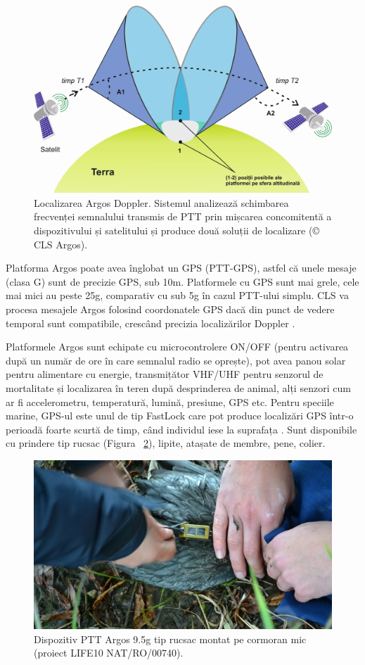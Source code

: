 \documentclass[11pt,onehalfspacing]{elife}
\begin{document}
\begin{figure}[ht]
\includegraphics[width=\textwidth]{Fig3.jpg}
\caption{Localizarea Argos Doppler. Sistemul analizează schimbarea frecvenței semnalului transmis de PTT prin mișcarea concomitentă a dispozitivului și satelitului și produce două soluții de localizare (© CLS Argos).} \label{fig3}
\end{figure}

Platforma Argos poate avea înglobat un GPS (PTT-GPS), astfel că unele mesaje (clasa G) sunt de precizie GPS, sub 10m. Platformele cu GPS sunt mai grele, cele mai mici au peste 25g, comparativ cu sub 5g în cazul PTT-ului simplu. CLS va procesa mesajele Argos folosind coordonatele GPS dacă din punct de vedere temporal sunt compatibile, crescând precizia localizărilor Doppler \citep{CLS2016}.

Platformele Argos sunt echipate cu microcontrolere ON/OFF (pentru activarea după un număr de ore în care semnalul radio se oprește), pot avea panou solar pentru alimentare cu energie, transmițător VHF/UHF pentru senzorul de mortalitate și localizarea în teren după desprinderea de animal, alți senzori cum ar fi accelerometru, temperatură, lumină, presiune, GPS etc. Pentru speciile marine, GPS-ul este unul de tip FastLock care pot produce localizări GPS într-o perioadă foarte scurtă de timp, când individul iese la suprafața \citep{Lowther2015}. Sunt disponibile cu prindere tip rucsac (Figura ~\ref{fig4}), lipite, atașate de membre, pene, colier.
\begin{figure}[ht]
\includegraphics[width=\textwidth]{Fig4.jpg}
\caption{Dispozitiv PTT Argos 9.5g tip rucsac montat pe cormoran mic (proiect LIFE10 NAT/RO/00740).} \label{fig4}
\end{figure}
\end{document}
